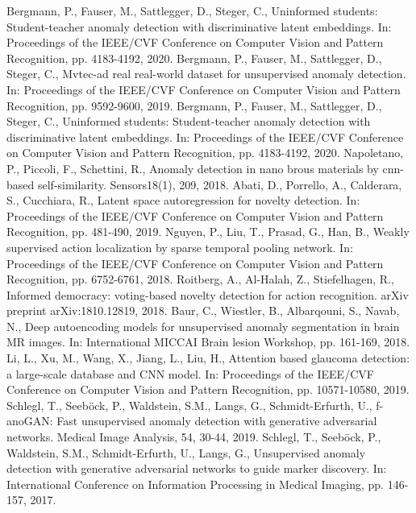 \documentclass[letterpaper, 10 pt, conference]{ieeeconf}
\begin{document}
\begin{thebibliography}{99}

 Bergmann, P., Fauser, M., Sattlegger, D., Steger, C., Uninformed students: Student-teacher anomaly detection with discriminative latent embeddings. In: Proceedings of the IEEE/CVF Conference on Computer Vision and Pattern Recognition, pp. 4183-4192, 2020.
 Bergmann, P., Fauser, M., Sattlegger, D., Steger, C., Mvtec-ad real real-world dataset for unsupervised anomaly detection. In: Proceedings of the IEEE/CVF Conference on Computer Vision and Pattern Recognition, pp. 9592-9600, 2019.
 Bergmann, P., Fauser, M., Sattlegger, D., Steger, C., Uninformed students: Student-teacher anomaly detection with discriminative latent embeddings. In: Proceedings of  the IEEE/CVF Conference on Computer Vision and Pattern Recognition, pp. 4183-4192, 2020.
 Napoletano, P., Piccoli, F., Schettini, R., Anomaly detection in nano brous materials by cnn-based self-similarity. Sensors18(1), 209, 2018.
Abati, D., Porrello, A., Calderara, S., Cucchiara, R., Latent  space  autoregression for novelty detection. In: Proceedings of the IEEE/CVF Conference on Computer Vision and Pattern Recognition, pp. 481-490, 2019.
 Nguyen, P., Liu, T., Prasad, G., Han, B., Weakly supervised action localization by sparse temporal pooling network. In: Proceedings of the IEEE/CVF Conference on Computer Vision and Pattern Recognition, pp. 6752-6761, 2018.
 Roitberg, A., Al-Halah, Z., Stiefelhagen, R., Informed democracy: voting-based novelty detection for action recognition. arXiv preprint arXiv:1810.12819, 2018.
 Baur, C., Wiestler, B., Albarqouni, S., Navab, N., Deep autoencoding models for unsupervised anomaly segmentation in brain MR images. In: International MICCAI Brain lesion Workshop, pp. 161-169, 2018.
 Li, L., Xu, M., Wang, X., Jiang, L., Liu, H., Attention based glaucoma detection: a large-scale database and CNN model. In: Proceedings of the IEEE/CVF Conference on Computer Vision and Pattern Recognition, pp. 10571-10580, 2019.
 Schlegl, T., Seeböck, P., Waldstein, S.M., Langs, G., Schmidt-Erfurth, U., f-anoGAN: Fast unsupervised anomaly detection with generative adversarial networks. Medical Image Analysis, 54, 30-44, 2019.
 Schlegl, T., Seeböck, P., Waldstein, S.M., Schmidt-Erfurth, U., Langs, G., Unsupervised anomaly detection with generative adversarial networks to guide marker discovery. In: International Conference on Information Processing in Medical Imaging, pp. 146-157, 2017.

\end{thebibliography}
\end{document}
